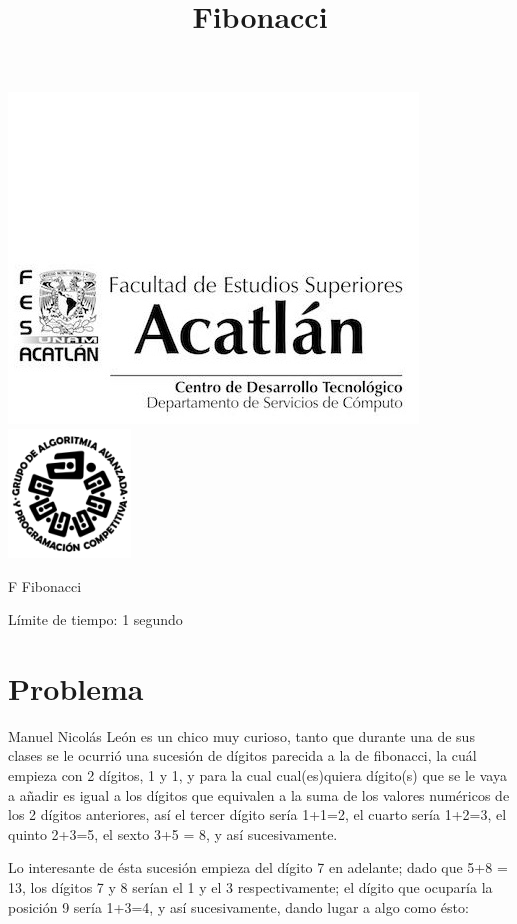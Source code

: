 \documentclass[letter,10pt]{article}
\date{}
\begin{document}
\title{Fibonacci}

\includegraphics[scale=0.6]{logo} \hspace*{9.00cm}
\includegraphics[scale=0.5]{dsc} 
\bigskip
\begin{center}
    \Large F Fibonacci
\end{center}

\begin{flushright}
Límite de tiempo: 1 segundo
\par\end{flushright}
\bigskip

\section*{Problema}

Manuel Nicolás León es un chico muy curioso, tanto que durante una de sus clases se le ocurrió una sucesión de dígitos parecida a la de fibonacci, la cuál empieza con 2 dígitos, 1 y 1, y para la cual cual(es)quiera dígito(s) que se le vaya a añadir es igual a los dígitos que equivalen a la suma de los valores numéricos de los 2 dígitos anteriores, así el tercer dígito sería 1+1=2, el cuarto sería 1+2=3, el quinto 2+3=5, el sexto 3+5 = 8, y así sucesivamente.

Lo interesante de ésta sucesión empieza del dígito 7 en adelante; dado que 5+8 = 13, los dígitos 7 y 8 serían el 1 y el 3 respectivamente; el dígito que ocuparía la posición 9 sería 1+3=4, y así sucesivamente, dando lugar a algo como ésto:
\end{document}
